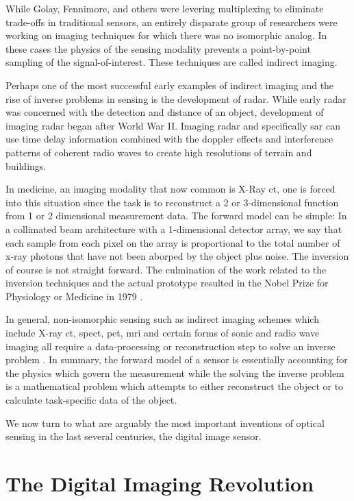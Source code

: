 While Golay, Fennimore, and others were levering multiplexing to eliminate trade-offs in traditional sensors, an entirely disparate group of researchers were working on imaging techniques for which there was no isomorphic analog. In these cases the physics of the sensing modality prevents a point-by-point sampling of the signal-of-interest. These techniques are called indirect imaging. 

Perhaps one of the most successful early examples of indirect imaging and the rise of inverse problems in sensing is the development of radar. While early radar was concerned with the detection and distance of an object, development of imaging radar began after World War II. Imaging radar and specifically \gls{sar} can use time delay information combined with the doppler effects and interference patterns of coherent radio waves to create high resolutions of terrain and buildings. 

In medicine, an imaging modality that now common is X-Ray \gls{ct}, one is forced into this situation since the task is to reconstruct a 2 or 3-dimensional function from 1 or 2 dimensional measurement data. The forward model can be simple: In a collimated beam architecture with a 1-dimensional detector array, we say that each sample from each pixel on the array is proportional to the total number of x-ray photons that have not been aborped by the object \cite{radon20051} plus noise. The inversion of course is not straight forward. The culmination of the work related to the inversion techniques and the actual prototype resulted in the Nobel Prize for Physiology or Medicine in 1979 \cite{nobelprize1979medicine}. 

In general, non-isomorphic sensing such as indirect imaging schemes which include X-ray \gls{ct}, \gls{spect}, \gls{pet}, \gls{mri} and certain forms of sonic and radio wave imaging all require a data-processing or reconstruction step to solve an inverse problem \cite{barrett2013foundations}. In summary, the forward model of a sensor is essentially accounting for the physics which govern the measurement while the solving the inverse problem is a mathematical problem which attempts to either reconstruct the object or to calculate task-specific data of the object. 

We now turn to what are arguably the most important inventions of optical sensing in the last several centuries, the digital image sensor. 

\section{The Digital Imaging Revolution}

